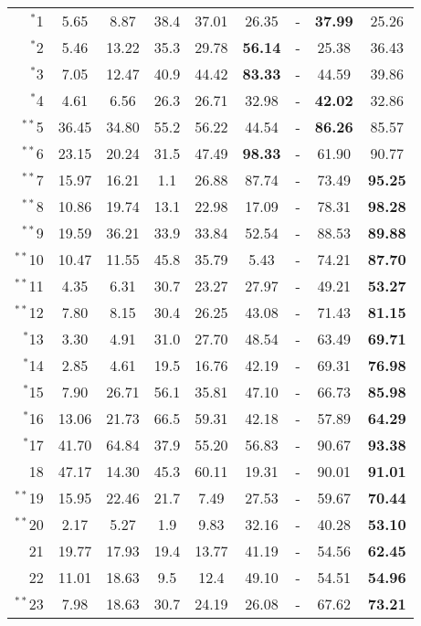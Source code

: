 {\begin{longtable}{r| c c c c c c c c}
        $^*$1&5.65 &8.87&38.4& 37.01&26.35 &-&\textbf{37.99} &25.26 \\
        $^*$2&5.46 &13.22&35.3&29.78 &\textbf{56.14} &-&25.38 &36.43 \\
        $^*$3&7.05 &12.47&40.9&44.42 &\textbf{83.33} &-&44.59 &39.86 \\
        $^*$4&4.61 &6.56&26.3&26.71 &32.98 &-&\textbf{42.02} &32.86 \\
        $^{**}$5&36.45 &34.80 &55.2&56.22&44.54 &-&\textbf{86.26} &85.57 \\
        $^{**}$6&23.15 &20.24 &31.5&47.49&\textbf{98.33} &-&61.90 &90.77 \\
        $^{**}$7&15.97 &16.21 &1.1&26.88&87.74 &-&73.49 &\textbf{95.25} \\
        $^{**}$8&10.86 &19.74 &13.1&22.98&17.09 &-&78.31 &\textbf{98.28} \\
        $^{**}$9&19.59 &36.21 &33.9&33.84&52.54 &-&88.53 &\textbf{89.88} \\
        $^{**}$10&10.47 &11.55 &45.8&35.79&5.43 &-&74.21 &\textbf{87.70} \\
        $^{**}$11&4.35 &6.31 &30.7&23.27&27.97 &-&49.21 &\textbf{53.27} \\
        $^{**}$12&7.80 &8.15 &30.4&26.25&43.08 &-&71.43 &\textbf{81.15} \\
        $^*$13&3.30 &4.91 &31.0&27.70&48.54 &-&63.49 &\textbf{69.71} \\
        $^*$14&2.85 &4.61 &19.5&16.76&42.19 &-&69.31 &\textbf{76.98} \\
        $^*$15&7.90 &26.71&56.1&35.81 &47.10 &-&66.73 &\textbf{85.98} \\
        $^*$16&13.06 &21.73 &66.5&59.31&42.18 &-&57.89 &\textbf{64.29} \\
        $^*$17&41.70 &64.84 &37.9&55.20&56.83 &-&90.67 &\textbf{93.38} \\
        18&47.17 &14.30 &45.3&60.11&19.31 &-&90.01 &\textbf{91.01} \\
        $^{**}$19&15.95 &22.46 &21.7&7.49&27.53 &-&59.67 &\textbf{70.44} \\
        $^{**}$20&2.17 &5.27 &1.9&9.83&32.16 &-&40.28 &\textbf{53.10} \\
        21&19.77 &17.93 &19.4&13.77&41.19 &-&54.56 &\textbf{62.45} \\
        22&11.01 &18.63 &9.5&12.4&49.10 &-&54.51 &\textbf{54.96} \\
        $^{**}$23&7.98 &18.63 &30.7&24.19&26.08 &-&67.62 &\textbf{73.21} \\

\end{longtable}}
